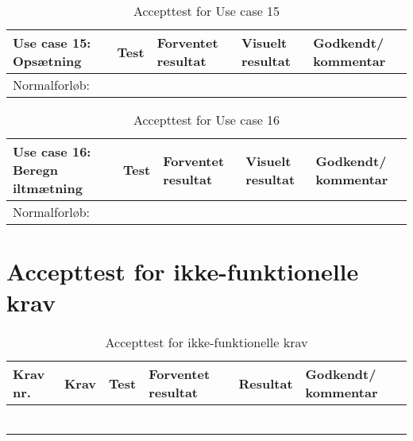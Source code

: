 \begin{table}[h!]
\caption{Accepttest for Use case 15}\label{tab:tabel8}
\begin{tabular}{|>{\raggedright\arraybackslash}p{2.5cm}| >{\raggedright\arraybackslash}p{2.9cm} | >{\raggedright\arraybackslash}p{2.9cm} | >{\raggedright\arraybackslash}p{2.9cm} | >{\raggedright\arraybackslash}p{2.8cm} |}
   \hline
   \textbf{Use case 15: Opsætning } &\textbf{Test}& \textbf{Forventet resultat} & \textbf{Visuelt resultat} & \textbf{Godkendt/ kommentar}\\ \hline
   Normalforløb:& & & &\\\hline
\end{tabular}
\end{table}


\begin{table}[h!]
\caption{Accepttest for Use case 16}\label{tab:tabel8}
\begin{tabular}{|>{\raggedright\arraybackslash}p{2.5cm}| >{\raggedright\arraybackslash}p{2.9cm} | >{\raggedright\arraybackslash}p{2.9cm} | >{\raggedright\arraybackslash}p{2.9cm} | >{\raggedright\arraybackslash}p{2.8cm} |}
   \hline
   \textbf{Use case 16: Beregn iltmætning} &\textbf{Test}& \textbf{Forventet resultat} & \textbf{Visuelt resultat} & \textbf{Godkendt/ kommentar}\\ \hline
   Normalforløb:& & & &\\\hline
\end{tabular}
\end{table}

\newpage
\newpage

\section{Accepttest for ikke-funktionelle krav}

\begin{longtable}{|>{\raggedright\arraybackslash}p{1.1cm}| >{\raggedright\arraybackslash}p{2.7cm} | >{\raggedright\arraybackslash}p{2.7cm} | >{\raggedright\arraybackslash}p{2.7cm} | >{\raggedright\arraybackslash}p{2.2cm} |>{\raggedright\arraybackslash}p{2.2cm}|}
   \caption{Accepttest for ikke-funktionelle krav}\label{tab:label13}
\\ \hline   
\textbf{Krav nr.}&\textbf{Krav} &\textbf{Test}& \textbf{Forventet resultat} & \textbf{Resultat} & \textbf{Godkendt/ kommentar}\\ \hline
   & & & & & \\\hline
   & & & & & \\\hline
   & & & & & \\\hline
   & & & & & \\\hline
   & & & & & \\\hline
   & & & & & \\\hline
\end{longtable}

